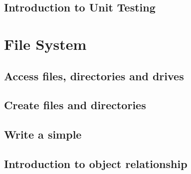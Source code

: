 \documentclass[
]{book}
\begin{document}
\hypertarget{introduction-to-unit-testing}{%
\section{Introduction to Unit Testing}\label{introduction-to-unit-testing}}

\hypertarget{file-system}{%
\chapter{File System}\label{file-system}}

\hypertarget{access-files-directories-and-drives}{%
\section{Access files, directories and drives}\label{access-files-directories-and-drives}}

\hypertarget{create-files-and-directories}{%
\section{Create files and directories}\label{create-files-and-directories}}

\hypertarget{write-a-simple}{%
\section{Write a simple}\label{write-a-simple}}

\hypertarget{introduction-to-object-relationship}{%
\section{Introduction to object relationship}\label{introduction-to-object-relationship}}

  
\end{document}

